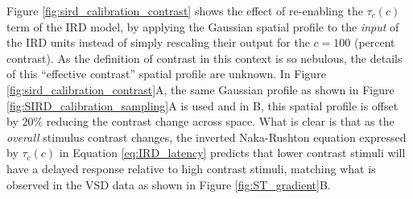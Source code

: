 \documentclass[phd,ianc,twoside]{infthesis}
\begin{document}
Figure \ref{fig:sird_calibration_contrast} shows the effect of
re-enabling the $\tau_c(c)$ term of the IRD model, by applying the
Gaussian spatial profile to the \emph{input} of the IRD units instead of
simply rescaling their output for the $c=100$ (percent contrast). As the
definition of contrast in this context is so nebulous, the details of
this ``effective contrast'' spatial profile are unknown. In Figure
\ref{fig:sird_calibration_contrast}A, the same Gaussian profile as shown
in Figure \ref{fig:SIRD_calibration_sampling}A is used and in B, this
spatial profile is offset by $20\%$ reducing the contrast change across
space. What is clear is that as the \emph{overall} stimulus contrast
changes, the inverted Naka-Rushton equation expressed by $\tau_c(c)$ in
Equation \ref{eq:IRD_latency} predicts that lower contrast stimuli will
have a delayed response relative to high contrast stimuli, matching what
is observed in the VSD data as shown in Figure \ref{fig:ST_gradient}B.
\end{document}
